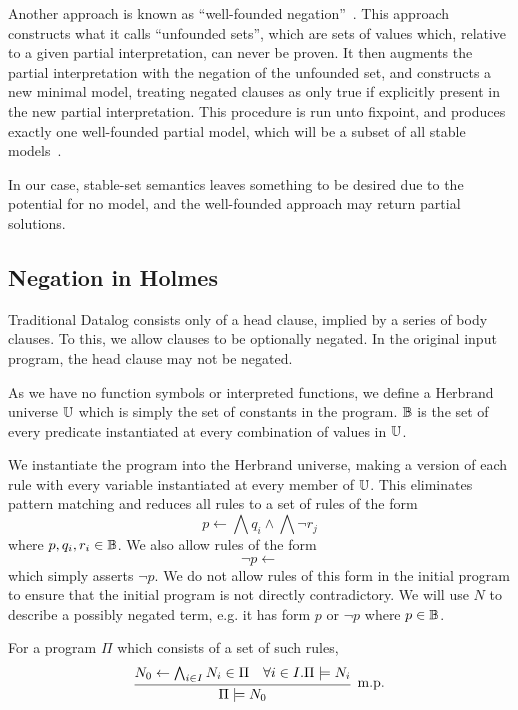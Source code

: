 Another approach is known as ``well-founded negation''~\cite{wellfounded}.
This approach constructs what it calls ``unfounded sets'', which are sets of values which, relative to a given partial interpretation, can never be proven.
It then augments the partial interpretation with the negation of the unfounded set, and constructs a new minimal model, treating negated clauses as only true if explicitly present in the new partial interpretation.
This procedure is run unto fixpoint, and produces exactly one well-founded partial model, which will be a subset of all stable models~\cite{wellfounded}.

In our case, stable-set semantics leaves something to be desired due to the potential for no model, and the well-founded approach may return partial solutions.
\subsection{Negation in Holmes}
Traditional Datalog consists only of a head clause, implied by a series of body clauses.
To this, we allow clauses to be optionally negated.
In the original input program, the head clause may not be negated.

As we have no function symbols or interpreted functions, we define a Herbrand universe $\mathbb{U}$ which is simply the set of constants in the program.
$\mathbb{B}$ is the set of every predicate instantiated at every combination of values in $\mathbb{U}$.

We instantiate the program into the Herbrand universe, making a version of each rule with every variable instantiated at every member of $\mathbb{U}$.
This eliminates pattern matching and reduces all rules to a set of rules of the form
\[
	p \leftarrow \bigwedge q_i \wedge \bigwedge \neg r_j
\]
where $p, q_i, r_i \in \mathbb{B}$.
We also allow rules of the form
\[
	\neg p \leftarrow
\]
which simply asserts $\neg p$.
We do not allow rules of this form in the initial program to ensure that the initial program is not directly contradictory.
We will use $N$ to describe a possibly negated term, e.g. it has form $p$ or $\neg p$ where $p \in \mathbb{B}$.

For a program $\Pi$ which consists of a set of such rules,
\[
	\infer[\textrm{m.p.}]{\Pi \models N_0}{N_0 \leftarrow \bigwedge_{i \in I} N_i \in \Pi & \forall i \in I. \Pi \models N_i}
\]

